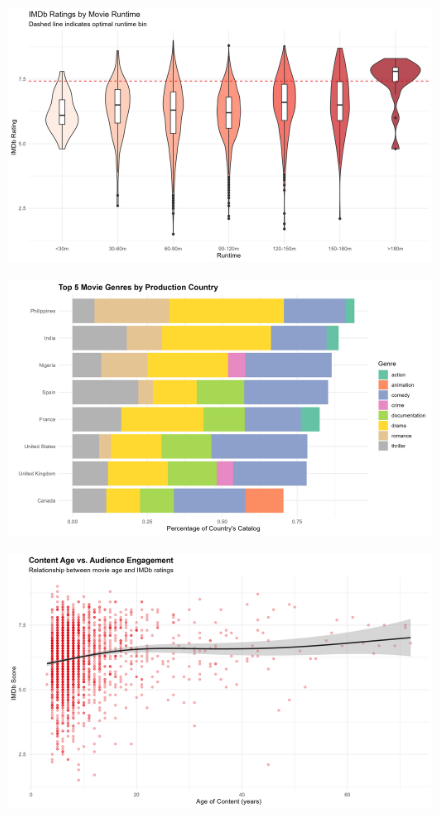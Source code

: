 \documentclass[
  man,floatsintext]{apa6}
\begin{document}
\begin{figure}

{\centering \includegraphics[width=0.9\linewidth]{../Question3/Results/IMDbratings} 

}

\caption{ }\label{fig:audienceengage-6}
\end{figure}
\begin{figure}

{\centering \includegraphics[width=0.9\linewidth]{../Question3/Results/top5movies} 

}

\caption{ }\label{fig:audienceengage-7}
\end{figure}
\begin{figure}

{\centering \includegraphics[width=0.9\linewidth]{../Question3/Results/viewership} 

}

\caption{ }\label{fig:audienceengage-8}
\end{figure}
\end{document}
